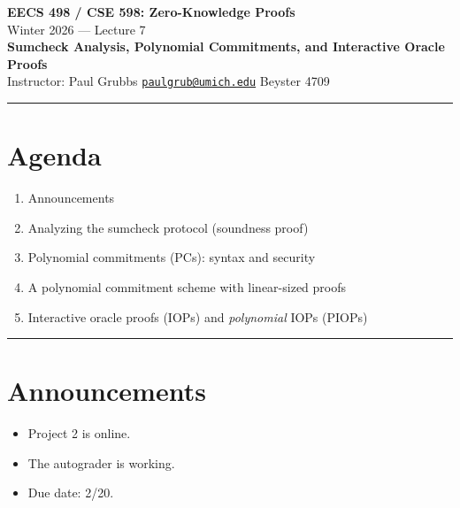\documentclass[11pt]{article}
\begin{document}
\begin{center}
  {\LARGE \textbf{EECS 498 / CSE 598: Zero-Knowledge Proofs}}\\[6pt]
  {\large Winter 2026 \quad --- \quad Lecture 7}\\[4pt]
  {\large \textbf{Sumcheck Analysis, Polynomial Commitments, and Interactive Oracle Proofs}}\\[4pt]
  {\normalsize Instructor: Paul Grubbs \quad
    \href{mailto:paulgrub@umich.edu}{\texttt{paulgrub@umich.edu}} \quad
    Beyster 4709}
\end{center}

\hrule
\vspace{10pt}

\section*{Agenda}
\begin{enumerate}
  \item Announcements
  \item Analyzing the sumcheck protocol (soundness proof)
  \item Polynomial commitments (PCs): syntax and security
  \item A polynomial commitment scheme with linear-sized proofs
  \item Interactive oracle proofs (IOPs) and \emph{polynomial} IOPs (PIOPs)
\end{enumerate}

\vspace{6pt}
\hrule
\vspace{10pt}

\section{Announcements}

\begin{itemize}
  \item Project 2 is online.
  \item The autograder is working.
  \item Due date: 2/20.
\end{itemize}
\end{document}
